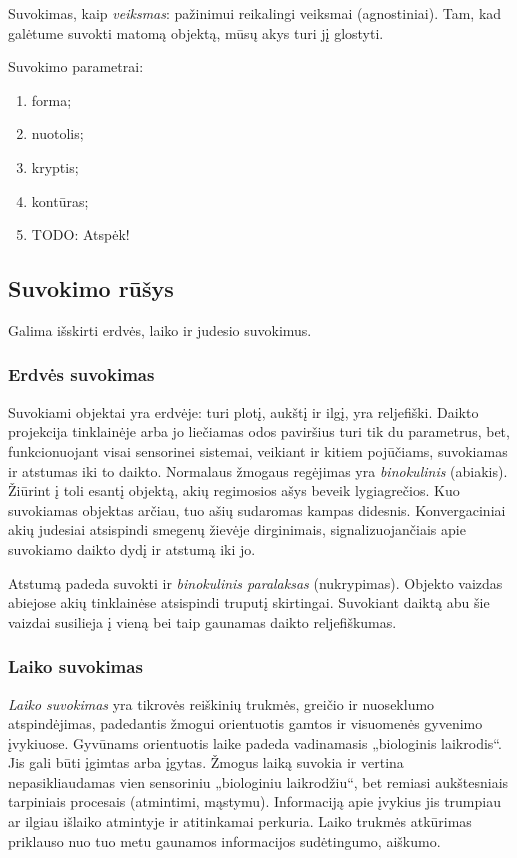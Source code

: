 Suvokimas, kaip \emph{veiksmas}: pažinimui reikalingi veiksmai 
(agnostiniai). %
Tam, kad galėtume suvokti matomą objektą, mūsų akys turi jį glostyti.


Suvokimo parametrai:

\begin{enumerate}
  \item forma;
  \item nuotolis;
  \item kryptis;
  \item kontūras;
  \item TODO: Atspėk!
\end{enumerate}

\subsection{Suvokimo rūšys}

Galima išskirti erdvės, laiko ir judesio suvokimus.

\subsubsection{Erdvės suvokimas}

Suvokiami objektai yra erdvėje: turi plotį, aukštį ir ilgį, yra reljefiški.
Daikto projekcija tinklainėje arba jo liečiamas odos paviršius turi tik du 
parametrus, bet, funkcionuojant visai sensorinei sistemai, veikiant ir 
kitiem pojūčiams, suvokiamas ir atstumas iki to daikto. Normalaus žmogaus 
regėjimas yra \emph{binokulinis} (abiakis). Žiūrint į toli esantį objektą,
akių regimosios ašys beveik lygiagrečios. Kuo suvokiamas objektas arčiau, 
tuo ašių sudaromas kampas didesnis. Konvergaciniai akių judesiai atsispindi 
smegenų žievėje dirginimais, signalizuojančiais apie suvokiamo daikto dydį
ir atstumą iki jo.

Atstumą padeda suvokti ir \emph{binokulinis paralaksas} (nukrypimas). 
Objekto vaizdas abiejose akių tinklainėse atsispindi truputį skirtingai. 
Suvokiant daiktą abu šie vaizdai susilieja į vieną bei taip gaunamas
daikto reljefiškumas.

\subsubsection{Laiko suvokimas}

\emph{Laiko suvokimas} yra tikrovės reiškinių trukmės, greičio ir nuoseklumo
atspindėjimas, padedantis žmogui orientuotis gamtos ir visuomenės gyvenimo
įvykiuose. Gyvūnams orientuotis laike padeda vadinamasis „biologinis 
laikrodis“. Jis gali būti įgimtas arba įgytas. Žmogus laiką suvokia ir 
vertina nepasikliaudamas vien sensoriniu „biologiniu laikrodžiu“, bet
remiasi aukštesniais tarpiniais procesais (atmintimi, mąstymu). Informaciją
apie įvykius jis trumpiau ar ilgiau išlaiko atmintyje ir atitinkamai 
perkuria. Laiko trukmės atkūrimas priklauso nuo tuo metu gaunamos 
informacijos sudėtingumo, aiškumo. 

